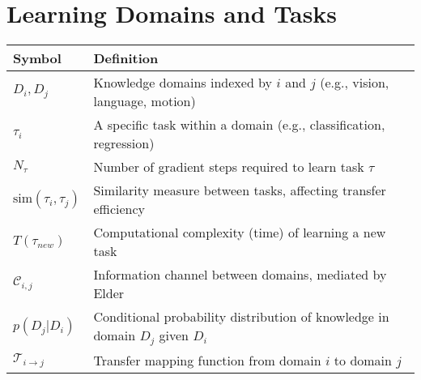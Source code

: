 \section*{Learning Domains and Tasks}
\begin{center}
\begin{tabular}{>{\centering\arraybackslash}p{3cm} p{10cm}}
\hline
\textbf{Symbol} & \textbf{Definition} \\
\hline
$D_i, D_j$ & Knowledge domains indexed by $i$ and $j$ (e.g., vision, language, motion) \\
$\tau_i$ & A specific task within a domain (e.g., classification, regression) \\
$N_{\tau}$ & Number of gradient steps required to learn task $\tau$ \\
$\text{sim}(\tau_i, \tau_j)$ & Similarity measure between tasks, affecting transfer efficiency \\
$T(\tau_{new})$ & Computational complexity (time) of learning a new task \\
$\mathcal{C}_{i,j}$ & Information channel between domains, mediated by Elder \\
$p(D_j|D_i)$ & Conditional probability distribution of knowledge in domain $D_j$ given $D_i$ \\
$\mathcal{T}_{i \to j}$ & Transfer mapping function from domain $i$ to domain $j$ \\
\hline
\end{tabular}
\end{center}

\vspace{0.5cm}

